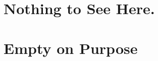 \documentclass[
]{book}
\begin{document}
\hypertarget{nothing-to-see-here.}{%
\chapter{Nothing to See Here.}\label{nothing-to-see-here.}}

\hypertarget{empty-on-purpose}{%
\chapter{Empty on Purpose}\label{empty-on-purpose}}

  
\end{document}
